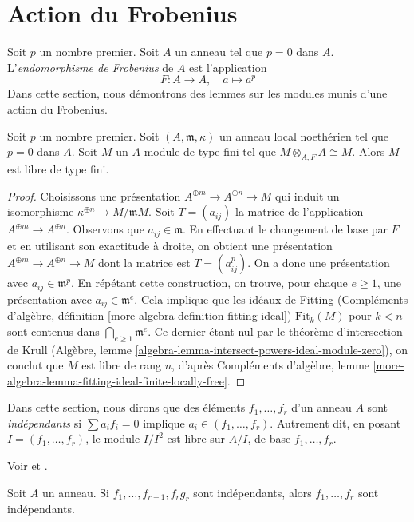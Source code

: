 \section{Action du Frobenius}
\label{section-frobenius}

\noindent
Soit $p$ un nombre premier. Soit $A$ un anneau tel que $p = 0$ dans $A$. L'{\it endomorphisme de Frobenius} de $A$ est l'application
$$
F : A \longrightarrow A,
\quad
a \longmapsto a^p
$$
Dans cette section, nous démontrons des lemmes sur les modules munis d'une action du Frobenius.

\begin{lemma}
\label{lemma-annihilator-frobenius-module}
Soit $p$ un nombre premier. Soit $(A, \mathfrak m, \kappa)$ un anneau local noethérien tel que $p = 0$ dans $A$. Soit $M$ un $A$-module de type fini tel que $M \otimes_{A, F} A \cong M$. Alors $M$ est libre de type fini.
\end{lemma}

\begin{proof}
Choisissons une présentation $A^{\oplus m} \to A^{\oplus n} \to M$ qui induit un isomorphisme $\kappa^{\oplus n} \to M/\mathfrak m M$. Soit $T = (a_{ij})$ la matrice de l'application $A^{\oplus m} \to A^{\oplus n}$. Observons que $a_{ij} \in \mathfrak m$. En effectuant le changement de base par $F$ et en utilisant son exactitude à droite, on obtient une présentation $A^{\oplus m} \to A^{\oplus n} \to M$ dont la matrice est $T = (a_{ij}^p)$. On a donc une présentation avec $a_{ij} \in \mathfrak m^p$. En répétant cette construction, on trouve, pour chaque $e \geq 1$, une présentation avec $a_{ij} \in \mathfrak m^e$. Cela implique que les idéaux de Fitting (Compléments d'algèbre, définition \ref{more-algebra-definition-fitting-ideal}) $\text{Fit}_k(M)$ pour $k < n$ sont contenus dans $\bigcap_{e \geq 1} \mathfrak m^e$. Ce dernier étant nul par le théorème d'intersection de Krull (Algèbre, lemme \ref{algebra-lemma-intersect-powers-ideal-module-zero}), on conclut que $M$ est libre de rang $n$, d'après Compléments d'algèbre, lemme \ref{more-algebra-lemma-fitting-ideal-finite-locally-free}.
\end{proof}

\noindent
Dans cette section, nous dirons que des éléments $f_1, \ldots, f_r$ d'un anneau $A$ sont {\it indépendants} si $\sum a_if_i = 0$ implique $a_i \in (f_1, \ldots, f_r)$. Autrement dit, en posant $I = (f_1, \ldots, f_r)$, le module $I/I^2$ est libre sur $A/I$, de base $f_1, \ldots, f_r$.

\begin{lemma}
\label{lemma-1}
\begin{reference}
Voir \cite{Lech-inequalities} et \cite[Lemma 1 page 299]{MatCA}.
\end{reference}
Soit $A$ un anneau. Si $f_1, \ldots, f_{r - 1}, f_rg_r$ sont indépendants, alors $f_1, \ldots, f_r$ sont indépendants.
\end{lemma}

